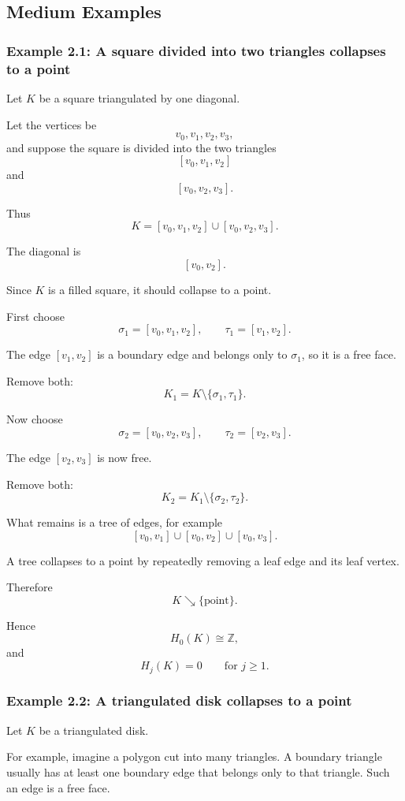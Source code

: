 \documentclass[12pt,a4paper]{article}
\theoremstyle{notespace}
\begin{document}
\subsection{Medium Examples}

\subsubsection{Example 2.1: A square divided into two triangles collapses to a point}

Let \(K\) be a square triangulated by one diagonal.

Let the vertices be
\[
v_0,v_1,v_2,v_3,
\]
and suppose the square is divided into the two triangles
\[
[v_0,v_1,v_2]
\]
and
\[
[v_0,v_2,v_3].
\]

Thus
\[
K=[v_0,v_1,v_2]\cup [v_0,v_2,v_3].
\]

The diagonal is
\[
[v_0,v_2].
\]

Since \(K\) is a filled square, it should collapse to a point.

First choose
\[
\sigma_1=[v_0,v_1,v_2],
\qquad
\tau_1=[v_1,v_2].
\]

The edge \([v_1,v_2]\) is a boundary edge and belongs only to \(\sigma_1\), so it is a free face.

Remove both:
\[
K_1=K\setminus\{\sigma_1,\tau_1\}.
\]

Now choose
\[
\sigma_2=[v_0,v_2,v_3],
\qquad
\tau_2=[v_2,v_3].
\]

The edge \([v_2,v_3]\) is now free.

Remove both:
\[
K_2=K_1\setminus\{\sigma_2,\tau_2\}.
\]

What remains is a tree of edges, for example
\[
[v_0,v_1]\cup [v_0,v_2]\cup [v_0,v_3].
\]

A tree collapses to a point by repeatedly removing a leaf edge and its leaf vertex.

Therefore
\[
K\searrow \{\text{point}\}.
\]

Hence
\[
H_0(K)\cong \mathbb Z,
\]
and
\[
H_j(K)=0
\qquad
\text{for }j\geq 1.
\]

\subsubsection{Example 2.2: A triangulated disk collapses to a point}

Let \(K\) be a triangulated disk.

For example, imagine a polygon cut into many triangles. A boundary triangle usually has at least one boundary edge that belongs only to that triangle. Such an edge is a free face.
\end{document}
